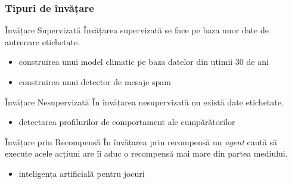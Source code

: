 \begin{frame}[t]
\begin{center}
  \end{center}
\end{frame}

\begin{frame}
  \frametitle{Tipuri de învățare}
  \begin{block}{Învățare Supervizată}
    \alert{Învățarea supervizată} se face pe baza unor date de antrenare etichetate.
    \begin{itemize}
    \item construirea unui model climatic pe baza datelor din utimii 30 de ani
    \item construirea unui detector de mesaje spam
    \end{itemize}
  \end{block}\pause
  \begin{block}{Învățare Nesupervizată}
    În \alert{învățarea nesupervizată} nu există date etichetate.
    \begin{itemize}
    \item detectarea profilurilor de comportament ale cumpărătorilor
    \end{itemize}
  \end{block}\pause
  \begin{block}{Învățare prin Recompensă}
    În \alert{învățarea prin recompensă} un \emph{agent} caută să execute acele
    acțiuni are îi aduc o recompensă mai mare din partea mediului.
    \begin{itemize}
    \item inteligența artificială pentru jocuri
    \end{itemize}
  \end{block}  
\end{frame}